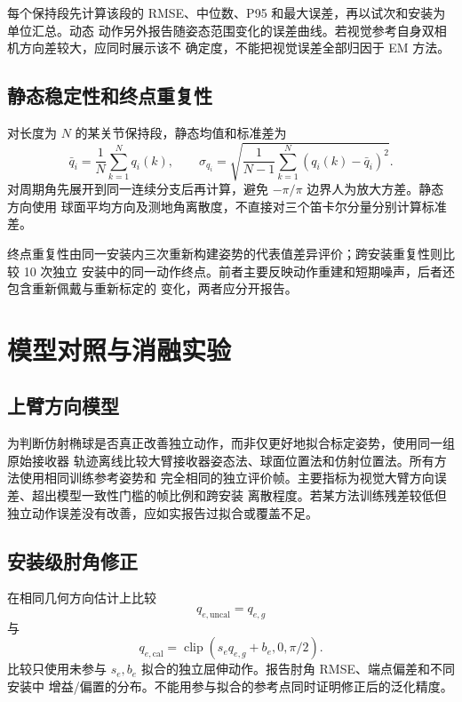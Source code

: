 每个保持段先计算该段的 RMSE、中位数、P95 和最大误差，再以试次和安装为单位汇总。动态
动作另外报告随姿态范围变化的误差曲线。若视觉参考自身双相机方向差较大，应同时展示该不
确定度，不能把视觉误差全部归因于 EM 方法。

\subsection{静态稳定性和终点重复性}
\label{subsec:ch6_static_repeatability}

对长度为 $N$ 的某关节保持段，静态均值和标准差为
\begin{equation}
  \bar q_i=\frac{1}{N}\sum_{k=1}^{N}q_i(k),\qquad
  \sigma_{q_i}=
  \sqrt{\frac{1}{N-1}
  \sum_{k=1}^{N}\left(q_i(k)-\bar q_i\right)^2}.
  \label{eq:ch6_static_joint_statistics}
\end{equation}
对周期角先展开到同一连续分支后再计算，避免 $-\pi/\pi$ 边界人为放大方差。静态方向使用
球面平均方向及测地角离散度，不直接对三个笛卡尔分量分别计算标准差。

终点重复性由同一安装内三次重新构建姿势的代表值差异评价；跨安装重复性则比较 10 次独立
安装中的同一动作终点。前者主要反映动作重建和短期噪声，后者还包含重新佩戴与重新标定的
变化，两者应分开报告。

\section{模型对照与消融实验}
\label{sec:ch6_model_ablations}

\subsection{上臂方向模型}
\label{subsec:ch6_upper_model_ablation}

为判断仿射椭球是否真正改善独立动作，而非仅更好地拟合标定姿势，使用同一组原始接收器
轨迹离线比较大臂接收器姿态法、球面位置法和仿射位置法。所有方法使用相同训练参考姿势和
完全相同的独立评价帧。主要指标为视觉大臂方向误差、超出模型一致性门槛的帧比例和跨安装
离散程度。若某方法训练残差较低但独立动作误差没有改善，应如实报告过拟合或覆盖不足。

\subsection{安装级肘角修正}
\label{subsec:ch6_elbow_ablation}

在相同几何方向估计上比较
\begin{equation}
  q_{e,\mathrm{uncal}}=q_{e,g}
  \label{eq:ch6_uncalibrated_elbow}
\end{equation}
与
\begin{equation}
  q_{e,\mathrm{cal}}=
  \operatorname{clip}(s_e q_{e,g}+b_e,0,\pi/2).
  \label{eq:ch6_calibrated_elbow}
\end{equation}
比较只使用未参与 $s_e,b_e$ 拟合的独立屈伸动作。报告肘角 RMSE、端点偏差和不同安装中
增益/偏置的分布。不能用参与拟合的参考点同时证明修正后的泛化精度。

